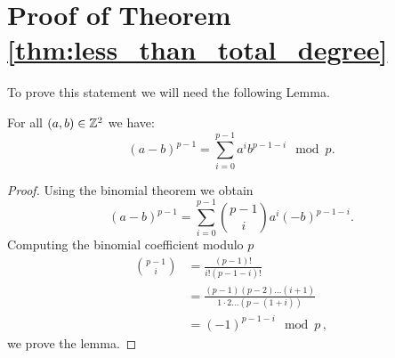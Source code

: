 \section{Proof of Theorem \ref{thm:less_than_total_degree}}
\label{proof_thm_less_than_total_degree}
To prove this statement we will need the following Lemma.

  \begin{lemma}\label{lem:difference_to_p-1}
    For all $(a,b)\in\mathbb{Z}^2$ we have:
    \[
      (a - b)^{p-1} = \sum_{i=0}^{p-1} a^i b^{p-1-i} \mod p.
    \]
  \end{lemma}
  \begin{proof}
    Using the binomial theorem we obtain
    \[
      (a - b)^{p-1} = \sum_{i=0}^{p-1} \binom{p-1}{i} a^i (-b)^{p-1-i}.
    \]
    Computing the binomial coefficient modulo $p$
    \begin{align*}
      \binom{p-1}{i} & = \frac{(p-1)!}{i! (p-1-i)!} \\
      & = \frac{(p-1)(p-2)\dots(i+1)}{1 \cdot 2 \dots (p-(1+i))} \\
      &= (-1)^{p-1-i} \mod p\,,
    \end{align*}
    we prove the lemma.
  \end{proof}

